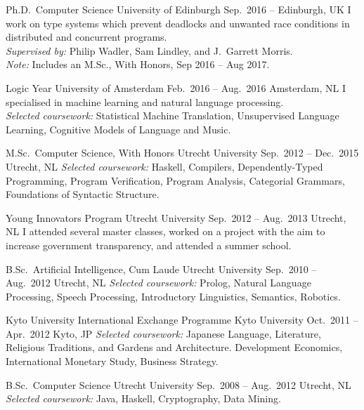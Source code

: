 \cvevent
{Ph.D.\ Computer Science}
{University of Edinburgh}
{Sep.\ 2016 --}
{Edinburgh, UK}
I work on type systems which prevent deadlocks and unwanted race conditions in distributed and concurrent programs. \\
\emph{Supervised by:}
Philip Wadler, Sam Lindley, and J.\ Garrett Morris. \\
\emph{Note:}
Includes an M.Sc., With Honors, Sep 2016 -- Aug 2017.

\divider

\cvevent
{Logic Year}
{University of Amsterdam}
{Feb.\ 2016 -- Aug.\ 2016}
{Amsterdam, NL}
I specialised in machine learning and natural language processing. \\
\emph{Selected coursework:}
Statistical Machine Translation, Unsupervised Language Learning, Cognitive
Models of Language and Music. \\

\divider

\cvevent
{M.Sc.\ Computer Science, With Honors}
{Utrecht University}
{Sep.\ 2012 -- Dec.\ 2015}
{Utrecht, NL}
\emph{Selected coursework:}
Haskell, Compilers, Dependently-Typed Programming, Program Verification, Program
Analysis, Categorial Grammars, Foundations of Syntactic Structure.\\

\divider

\cvevent
{Young Innovators Program}
{Utrecht University}
{Sep.\ 2012 -- Aug.\ 2013}
{Utrecht, NL}
I attended several master classes, worked on a project with the aim to
increase government transparency, and attended a summer school.

\divider

\cvevent
{B.Sc.\ Artificial Intelligence, Cum Laude}
{Utrecht University}
{Sep.\ 2010 -- Aug.\ 2012}
{Utrecht, NL}
\emph{Selected coursework:}
Prolog, Natural Language Processing, Speech Processing, Introductory
Linguistics, Semantics, Robotics.

\divider

\cvevent
{Kyto University International Exchange Programme}
{Kyto University}
{Oct.\ 2011 -- Apr.\ 2012}
{Kyto, JP}
\emph{Selected coursework:}
Japanese Language, Literature, Religious Traditions, and Gardens and Architecture.
Development Economics, International Monetary Study, Business Strategy. \\

\divider

\cvevent
{B.Sc.\ Computer Science}
{Utrecht University}
{Sep.\ 2008 -- Aug.\ 2012}
{Utrecht, NL}
\textit{Selected coursework:}
Java, Haskell, Cryptography, Data Mining.
